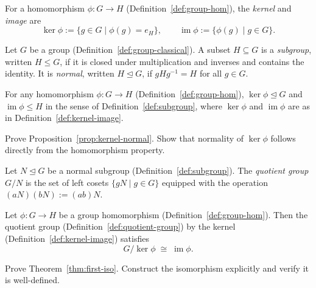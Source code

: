 \begin{definition}
\label{def:kernel-image}
For a homomorphism $\phi : G \to H$ (Definition~\ref{def:group-hom}), the \emph{kernel} and \emph{image} are
\[
  \ker \phi := \{ g \in G \mid \phi(g) = e_H \}, \qquad
  \operatorname{im} \phi := \{ \phi(g) \mid g \in G \}.
\]
\end{definition}

\begin{definition}
\label{def:subgroup}
Let $G$ be a group (Definition~\ref{def:group-classical}).
A subset $H \subseteq G$ is a \emph{subgroup}, written $H \leq G$, if it is closed under multiplication and inverses and contains the identity.
It is \emph{normal}, written $H \trianglelefteq G$, if $gHg^{-1} = H$ for all $g \in G$.
\end{definition}

\begin{proposition}
\label{prop:kernel-normal}
For any homomorphism $\phi : G \to H$ (Definition~\ref{def:group-hom}),
$\ker \phi \trianglelefteq G$ and $\operatorname{im} \phi \leq H$
in the sense of Definition~\ref{def:subgroup}, where $\ker\phi$ and $\operatorname{im}\phi$ are as in Definition~\ref{def:kernel-image}.
\end{proposition}

\begin{exercise}
Prove Proposition~\ref{prop:kernel-normal}. Show that normality of $\ker\phi$ follows directly from the homomorphism property.
\end{exercise}

\begin{definition}
\label{def:quotient-group}
Let $N \trianglelefteq G$ be a normal subgroup (Definition~\ref{def:subgroup}).
The \emph{quotient group} $G/N$ is the set of left cosets $\{ gN \mid g \in G \}$ equipped with the operation $(aN)(bN) := (ab)N$.
\end{definition}

\begin{theorem}
\label{thm:first-iso}
Let $\phi : G \to H$ be a group homomorphism (Definition~\ref{def:group-hom}).
Then the quotient group (Definition~\ref{def:quotient-group}) by the kernel (Definition~\ref{def:kernel-image}) satisfies
\[
  G / \ker\phi \;\cong\; \operatorname{im}\phi.
\]
\end{theorem}

\begin{exercise}
Prove Theorem~\ref{thm:first-iso}. Construct the isomorphism explicitly and verify it is well-defined.
\end{exercise}

